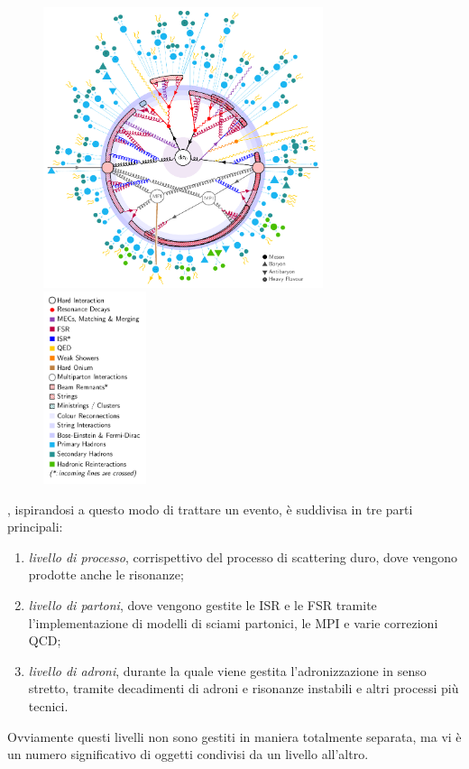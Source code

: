\begin{figure}[htpb]
\centering %
\includegraphics[width=0.73\textwidth]{image/2-modelli/event.pdf}%
\includegraphics[width=0.27\textwidth]{image/2-modelli/eventLegend.pdf}
\end{figure}

\pythiaa{}, ispirandosi a questo modo di trattare un evento, è suddivisa in tre parti principali:
\begin{enumerate}
    \item \emph{livello di processo}, corrispettivo del processo di scattering duro, dove vengono prodotte anche le risonanze;
    \item \emph{livello di partoni}, dove vengono gestite le ISR e le FSR tramite l'implementazione di modelli di sciami partonici, le MPI e varie correzioni QCD;
    \item \emph{livello di adroni}, durante la quale viene gestita l'adronizzazione in senso stretto, tramite decadimenti di adroni e risonanze instabili e altri processi più tecnici.
\end{enumerate}
Ovviamente questi livelli non sono gestiti in maniera totalmente separata, ma vi è un numero significativo di oggetti condivisi da un livello all'altro.


